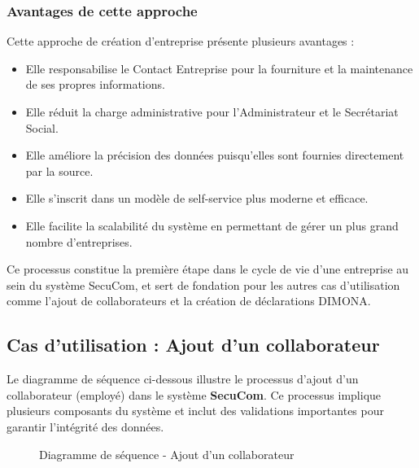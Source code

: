 \subsubsection{Avantages de cette approche}

Cette approche de création d'entreprise présente plusieurs avantages :
\begin{itemize}
  \item Elle responsabilise le Contact Entreprise pour la fourniture et la maintenance de ses propres informations.
  \item Elle réduit la charge administrative pour l'Administrateur et le Secrétariat Social.
  \item Elle améliore la précision des données puisqu'elles sont fournies directement par la source.
  \item Elle s'inscrit dans un modèle de self-service plus moderne et efficace.
  \item Elle facilite la scalabilité du système en permettant de gérer un plus grand nombre d'entreprises.
\end{itemize}

Ce processus constitue la première étape dans le cycle de vie d'une entreprise au sein du système SecuCom, et sert de fondation pour les autres cas d'utilisation comme l'ajout de collaborateurs et la création de déclarations DIMONA.

\subsection{Cas d'utilisation : Ajout d'un collaborateur}

\noindent Le diagramme de séquence ci-dessous illustre le processus d'ajout d'un collaborateur (employé) dans le système \textbf{SecuCom}. Ce processus implique plusieurs composants du système et inclut des validations importantes pour garantir l'intégrité des données.

\begin{figure}[H]
\caption{Diagramme de séquence - Ajout d'un collaborateur}
\end{figure}

